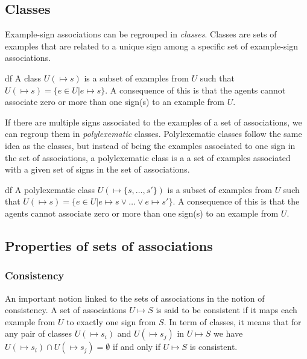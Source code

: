 \subsection{Classes}
Example-sign associations can be regrouped in \emph{classes}. Classes are sets of examples that are related to a unique sign among a specific set of example-sign associations.

\begin{restatable}[Class]{df}
A class $U(\mapsto s)$ is a subset of examples from $U$ such that $U(\mapsto s) =  \{e \in U | e \mapsto s \}$. A consequence of this is that the agents cannot associate zero or more than one sign(s) to an example from $U$.
\end{restatable}

If there are multiple signs associated to the examples of a set of associations, we can regroup them in \emph{polylexematic} classes. Polylexematic classes follow the same idea as the classes, but instead of being the examples associated to one sign in the set of associations, a polylexematic class is a a set of examples associated with a given set of signs in the set of associations.

\begin{restatable}{df}
A polylexematic class $U(\mapsto \{s, \ldots, s'\})$ is a subset of examples from $U$ such that $U(\mapsto s) =  \{e \in U | e \mapsto s \vee \ldots \vee e \mapsto s' \}$. A consequence of this is that the agents cannot associate zero or more than one sign(s) to an example from $U$.
\end{restatable}

\subsection{Properties of sets of associations}
\subsubsection{Consistency}
An important notion linked to the sets of associations in the notion of consistency. A set of associations $U \mapsto S$ is said to be consistent if it maps each example from $U$ to exactly one sign from $S$. In term of classes, it means that for any pair of classes $U(\mapsto s_{i})$ and $U(\mapsto s_{j})$ in $U \mapsto S$ we have $U(\mapsto s_{i}) \cap U(\mapsto s_{j}) = \emptyset$ if and only if $U \mapsto S$ is consistent.

